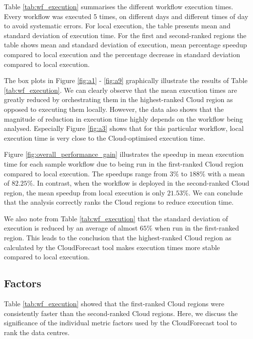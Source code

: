 \documentclass[10pt, conference, compsocconf]{IEEEtran}
\newcommand{\sysname}{CloudForecast\xspace}
\begin{document}
Table \ref{tab:wf_execution} summarises the different workflow execution times. Every workflow was executed 5 times, on different days and different times of day to avoid systematic errors. For local execution, the table presents mean and standard deviation of execution time. For the first and second-ranked regions the table shows mean and standard deviation of execution, mean percentage speedup compared to local execution and the percentage decrease in standard deviation compared to local execution.

The box plots in Figure \ref{fig:a1} - \ref{fig:a9} graphically illustrate the results of Table \ref{tab:wf_execution}. We can clearly observe that the mean execution times are greatly reduced by orchestrating them in the highest-ranked Cloud region as opposed to executing them locally. However, the data also shows that the magnitude of reduction in execution time highly depends on the workflow being analysed. Especially Figure \ref{fig:a3} shows that for this particular workflow, local execution time is very close to the Cloud-optimised execution time.

Figure \ref{fig:overall_performance_gain} illustrates the speedup in mean execution time for each sample workflow due to being run in the first-ranked Cloud region compared to local execution. The speedups range from $3\%$ to $188\%$ with a mean of $82.25\%$. In contrast, when the workflow is deployed in the second-ranked Cloud region, the mean speedup from local execution is only $21.53\%$. We can conclude that the analysis correctly ranks the Cloud regions to reduce execution time.

We also note from Table \ref{tab:wf_execution} that the standard deviation of execution is reduced by an average of almost $65\%$ when run in the first-ranked region. This leads to the conclusion that the highest-ranked Cloud region as calculated by the \sysname tool makes execution times more stable compared to local execution.






\subsection{Factors}

Table \ref{tab:wf_execution} showed that the first-ranked Cloud regions were consistently faster than the second-ranked Cloud regions. Here, we discuss the significance of the individual metric factors used by the \sysname tool to rank the data centres.
\end{document}
